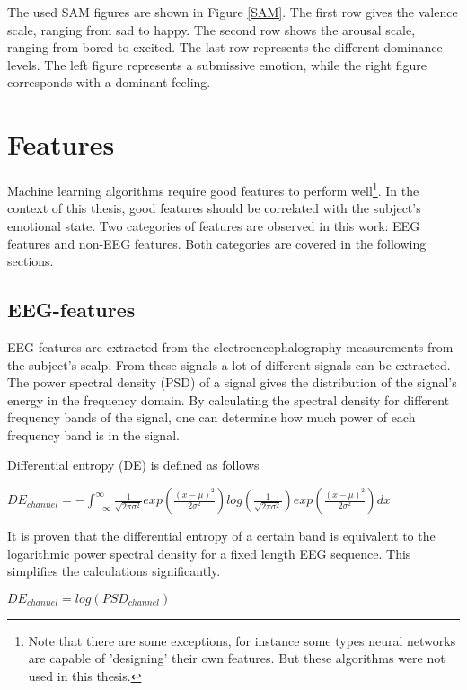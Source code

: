 \npar

The used SAM figures are shown in Figure \ref{SAM}. The first row gives the valence scale, ranging from sad to happy. The second row shows the arousal scale, ranging from bored to excited. The last row represents the different dominance levels. The left figure represents a submissive emotion, while the right figure corresponds with a dominant feeling.


\section{Features}
\label{featuresExplained}
Machine learning algorithms require good features to perform well\footnote{Note that there are some exceptions, for instance some types neural networks are capable of 'designing' their own features\citep{nnfeat}. But these algorithms were not used in this thesis.}. In the context of this thesis, good features should be correlated with the subject's emotional state. Two categories of features are observed in this work: EEG features and non-EEG features. Both categories are covered in the following sections.

\subsection{EEG-features}
EEG features are extracted from the electroencephalography measurements from the subject's scalp. From these signals a lot of different signals can be extracted. The power spectral density (PSD)  of a signal gives the distribution of the signal's energy in the frequency domain. By calculating the spectral density for different frequency bands of the signal, one can determine how much power of each frequency band is in the signal.

\npar

Differential entropy (DE) is defined as follows \citep{killyPaper} \\
\begin{center}
$DE_{channel} = - \int_{-\infty}^{\infty} \frac{1}{\sqrt{2\pi\sigma^2}} exp(\frac{(x-\mu)^2}{2\sigma^2}) log(\frac{1}{\sqrt{2\pi\sigma^2}}) exp(\frac{(x-\mu)^2}{2\sigma^2})dx$
\end{center}
It is proven that the differential entropy of a certain band is equivalent to the logarithmic power spectral density for a fixed length EEG sequence\citep{diffEnt}. This simplifies the calculations significantly.
\begin{center}
$DE_{channel} = log(PSD_{channel})$
\end{center}


